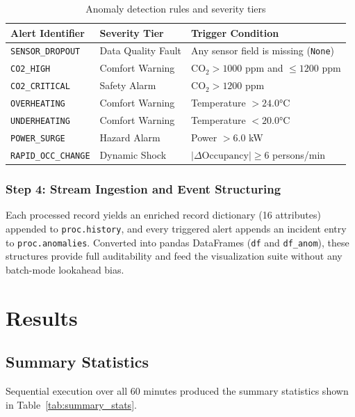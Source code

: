 \documentclass[12pt,a4paper]{article}
\begin{document}
\begin{table}[h!]
\centering
\caption{Anomaly detection rules and severity tiers}
\label{tab:rules}
\begin{tabular}{lll}
\toprule
\textbf{Alert Identifier} & \textbf{Severity Tier} & \textbf{Trigger Condition} \\
\midrule
\texttt{SENSOR\_DROPOUT}     & Data Quality Fault & Any sensor field is missing (\texttt{None}) \\
\texttt{CO2\_HIGH}           & Comfort Warning   & $\text{CO}_2 > 1000$ ppm and $\le 1200$ ppm \\
\texttt{CO2\_CRITICAL}       & Safety Alarm      & $\text{CO}_2 > 1200$ ppm \\
\texttt{OVERHEATING}         & Comfort Warning   & Temperature $> 24.0$°C \\
\texttt{UNDERHEATING}        & Comfort Warning   & Temperature $< 20.0$°C \\
\texttt{POWER\_SURGE}        & Hazard Alarm      & Power $> 6.0$ kW \\
\texttt{RAPID\_OCC\_CHANGE}  & Dynamic Shock     & $|\Delta\text{Occupancy}| \ge 6$ persons/min \\
\bottomrule
\end{tabular}
\end{table}

\subsubsection{Step 4: Stream Ingestion and Event Structuring}

Each processed record yields an enriched record dictionary (16 attributes) appended to \texttt{proc.history}, and every triggered alert appends an incident entry to \texttt{proc.anomalies}. Converted into pandas DataFrames (\texttt{df} and \texttt{df\_anom}), these structures provide full auditability and feed the visualization suite without any batch-mode lookahead bias.

\section{Results}

\subsection{Summary Statistics}

Sequential execution over all 60 minutes produced the summary statistics shown in Table~\ref{tab:summary_stats}.
\end{document}
